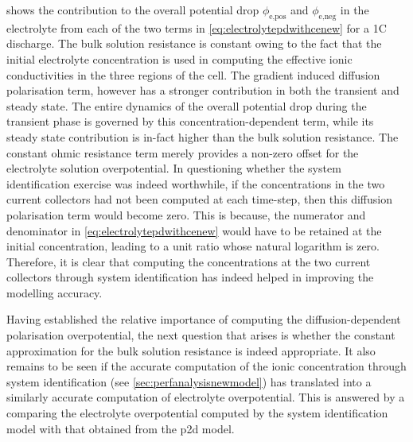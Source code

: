  shows the  contribution to the overall
potential drop  $\phi_\text{e,pos}$ and  $\phi_\text{e,neg}$ in  the electrolyte
from  each  of  the  two  terms  in \cref{eq:electrolytepdwithcenew}  for  a  1C
discharge. The bulk  solution resistance is constant owing to  the fact that the
initial  electrolyte concentration  is  used in  computing  the effective  ionic
conductivities in the three regions of  the cell. The gradient induced diffusion
polarisation term, however has a stronger contribution in both the transient and
steady  state. The  entire dynamics  of the  overall potential  drop during  the
transient  phase is  governed by  this concentration-dependent  term, while  its
steady state contribution  is in-fact higher than the  bulk solution resistance.
The  constant  ohmic resistance  term  merely  provides  a non-zero  offset  for
the  electrolyte  solution  overpotential.  In questioning  whether  the  system
identification exercise was indeed worthwhile,  if the concentrations in the two
current collectors had not been computed  at each time-step, then this diffusion
polarisation  term  would  become  zero.  This is  because,  the  numerator  and
denominator in \cref{eq:electrolytepdwithcenew} would have to be retained at the
initial concentration, leading to a unit  ratio whose natural logarithm is zero.
Therefore, it  is clear  that computing  the concentrations  at the  two current
collectors  through system  identification has  indeed helped  in improving  the
modelling accuracy.

Having established the relative  importance of computing the diffusion-dependent
polarisation   overpotential,  the   next  question   that  arises   is  whether
the   constant    approximation   for   the   bulk    solution   resistance   is
indeed   appropriate.   It  also   remains   to   be   seen  if   the   accurate
computation   of  the   ionic   concentration   through  system   identification
(see \cref{sec:perfanalysisnewmodel}) has  translated into a  similarly accurate
computation of  electrolyte overpotential. This  is answered by a  comparing the
electrolyte overpotential computed by the  system identification model with that
obtained from the \gls{p2d} model.

